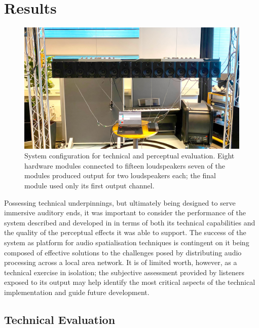 \section{Results}\label{sec:results}

\begin{figure}[ht]
    \centering
    \includegraphics[width=\textwidth]{figures/eval-setup}
    \caption{
        System configuration for technical and perceptual evaluation.
        Eight hardware modules connected to fifteen loudspeakers \textemdash{}
        seven of the modules produced output for two loudspeakers each; the
        final module used only its first output channel.
    }
    \label{fig:eval-setup}
\end{figure}

Possessing technical underpinnings, but ultimately being designed to
serve immersive auditory ends, it was important to consider the performance of
the system described and developed in  in terms of
both its technical capabilities and the quality of the perceptual effects it
was able to support.
The success of the system as platform for audio spatialisation techniques is
contingent on it being composed of effective solutions to the challenges posed
by distributing audio processing across a local area network.
It is of limited worth, however, as a technical exercise in isolation;
the subjective assessment provided by listeners exposed to its output may help
identify the most critical aspects of the technical implementation and guide
future development.

\subsection{Technical Evaluation}\label{subsec:technical-evaluation}


